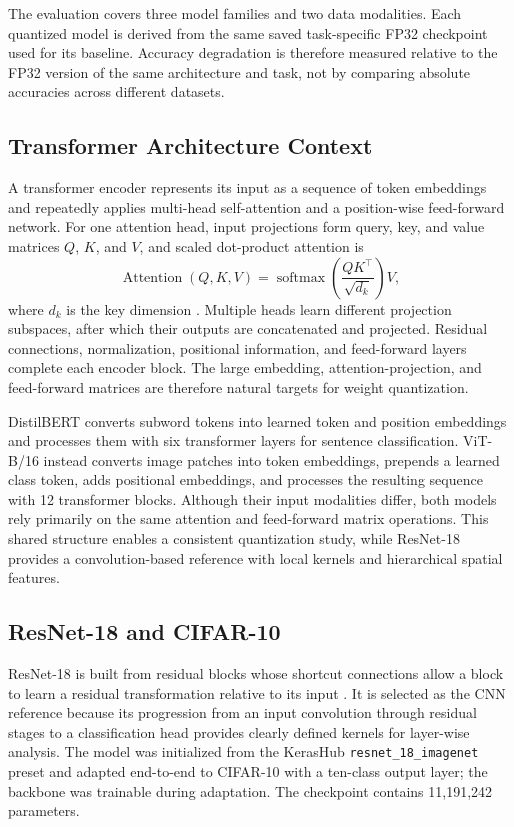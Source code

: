 \documentclass[conference]{IEEEtran}
\begin{document}
The evaluation covers three model families and two data modalities. Each quantized model is derived from the same saved task-specific FP32 checkpoint used for its baseline. Accuracy degradation is therefore measured relative to the FP32 version of the same architecture and task, not by comparing absolute accuracies across different datasets.

\subsection{Transformer Architecture Context}

A transformer encoder represents its input as a sequence of token embeddings and repeatedly applies multi-head self-attention \cite{vaswani2017} and a position-wise feed-forward network. For one attention head, input projections form query, key, and value matrices $Q$, $K$, and $V$, and scaled dot-product attention is
\begin{equation}
\operatorname{Attention}(Q,K,V)
=\operatorname{softmax}\!\left(\frac{QK^{\top}}{\sqrt{d_k}}\right)V,
\end{equation}
where $d_k$ is the key dimension \cite{vaswani2017}. Multiple heads learn different projection subspaces, after which their outputs are concatenated and projected. Residual connections, normalization, positional information, and feed-forward layers complete each encoder block. The large embedding, attention-projection, and feed-forward matrices are therefore natural targets for weight quantization.

DistilBERT converts subword tokens into learned token and position embeddings and processes them with six transformer layers for sentence classification. ViT-B/16 instead converts image patches into token embeddings, prepends a learned class token, adds positional embeddings, and processes the resulting sequence with 12 transformer blocks. Although their input modalities differ, both models rely primarily on the same attention and feed-forward matrix operations. This shared structure enables a consistent quantization study, while ResNet-18 provides a convolution-based reference with local kernels and hierarchical spatial features.

\subsection{ResNet-18 and CIFAR-10}

ResNet-18 is built from residual blocks whose shortcut connections allow a block to learn a residual transformation relative to its input \cite{he2016}. It is selected as the CNN reference because its progression from an input convolution through residual stages to a classification head provides clearly defined kernels for layer-wise analysis. The model was initialized from the KerasHub \texttt{resnet\_18\_imagenet} preset and adapted end-to-end to CIFAR-10 with a ten-class output layer; the backbone was trainable during adaptation. The checkpoint contains 11,191,242 parameters.
\end{document}
